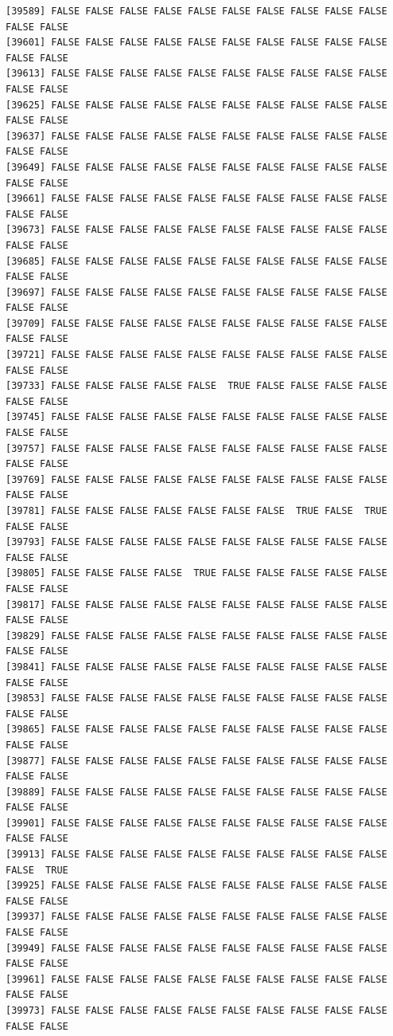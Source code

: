 \documentclass[
  a4paper,
  DIV=11,
  numbers=noendperiod]{scrartcl}
\begin{document}
\begin{verbatim}
[39589] FALSE FALSE FALSE FALSE FALSE FALSE FALSE FALSE FALSE FALSE FALSE FALSE
[39601] FALSE FALSE FALSE FALSE FALSE FALSE FALSE FALSE FALSE FALSE FALSE FALSE
[39613] FALSE FALSE FALSE FALSE FALSE FALSE FALSE FALSE FALSE FALSE FALSE FALSE
[39625] FALSE FALSE FALSE FALSE FALSE FALSE FALSE FALSE FALSE FALSE FALSE FALSE
[39637] FALSE FALSE FALSE FALSE FALSE FALSE FALSE FALSE FALSE FALSE FALSE FALSE
[39649] FALSE FALSE FALSE FALSE FALSE FALSE FALSE FALSE FALSE FALSE FALSE FALSE
[39661] FALSE FALSE FALSE FALSE FALSE FALSE FALSE FALSE FALSE FALSE FALSE FALSE
[39673] FALSE FALSE FALSE FALSE FALSE FALSE FALSE FALSE FALSE FALSE FALSE FALSE
[39685] FALSE FALSE FALSE FALSE FALSE FALSE FALSE FALSE FALSE FALSE FALSE FALSE
[39697] FALSE FALSE FALSE FALSE FALSE FALSE FALSE FALSE FALSE FALSE FALSE FALSE
[39709] FALSE FALSE FALSE FALSE FALSE FALSE FALSE FALSE FALSE FALSE FALSE FALSE
[39721] FALSE FALSE FALSE FALSE FALSE FALSE FALSE FALSE FALSE FALSE FALSE FALSE
[39733] FALSE FALSE FALSE FALSE FALSE  TRUE FALSE FALSE FALSE FALSE FALSE FALSE
[39745] FALSE FALSE FALSE FALSE FALSE FALSE FALSE FALSE FALSE FALSE FALSE FALSE
[39757] FALSE FALSE FALSE FALSE FALSE FALSE FALSE FALSE FALSE FALSE FALSE FALSE
[39769] FALSE FALSE FALSE FALSE FALSE FALSE FALSE FALSE FALSE FALSE FALSE FALSE
[39781] FALSE FALSE FALSE FALSE FALSE FALSE FALSE  TRUE FALSE  TRUE FALSE FALSE
[39793] FALSE FALSE FALSE FALSE FALSE FALSE FALSE FALSE FALSE FALSE FALSE FALSE
[39805] FALSE FALSE FALSE FALSE  TRUE FALSE FALSE FALSE FALSE FALSE FALSE FALSE
[39817] FALSE FALSE FALSE FALSE FALSE FALSE FALSE FALSE FALSE FALSE FALSE FALSE
[39829] FALSE FALSE FALSE FALSE FALSE FALSE FALSE FALSE FALSE FALSE FALSE FALSE
[39841] FALSE FALSE FALSE FALSE FALSE FALSE FALSE FALSE FALSE FALSE FALSE FALSE
[39853] FALSE FALSE FALSE FALSE FALSE FALSE FALSE FALSE FALSE FALSE FALSE FALSE
[39865] FALSE FALSE FALSE FALSE FALSE FALSE FALSE FALSE FALSE FALSE FALSE FALSE
[39877] FALSE FALSE FALSE FALSE FALSE FALSE FALSE FALSE FALSE FALSE FALSE FALSE
[39889] FALSE FALSE FALSE FALSE FALSE FALSE FALSE FALSE FALSE FALSE FALSE FALSE
[39901] FALSE FALSE FALSE FALSE FALSE FALSE FALSE FALSE FALSE FALSE FALSE FALSE
[39913] FALSE FALSE FALSE FALSE FALSE FALSE FALSE FALSE FALSE FALSE FALSE  TRUE
[39925] FALSE FALSE FALSE FALSE FALSE FALSE FALSE FALSE FALSE FALSE FALSE FALSE
[39937] FALSE FALSE FALSE FALSE FALSE FALSE FALSE FALSE FALSE FALSE FALSE FALSE
[39949] FALSE FALSE FALSE FALSE FALSE FALSE FALSE FALSE FALSE FALSE FALSE FALSE
[39961] FALSE FALSE FALSE FALSE FALSE FALSE FALSE FALSE FALSE FALSE FALSE FALSE
[39973] FALSE FALSE FALSE FALSE FALSE FALSE FALSE FALSE FALSE FALSE FALSE FALSE

\end{verbatim}
\end{document}
